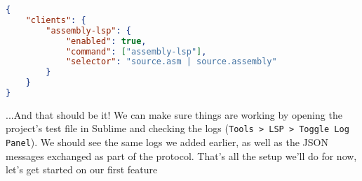 \begin{lstlisting}[language=json]
{
    "clients": {
        "assembly-lsp": {
            "enabled": true,
            "command": ["assembly-lsp"],
            "selector": "source.asm | source.assembly"
        }
    }
}
\end{lstlisting}

...And that should be it! We can make sure things are working by opening the project's
test file in Sublime and checking the logs (\texttt{Tools > LSP > Toggle Log Panel}). 
We should see the same logs we added earlier, as well as the JSON messages exchanged
as part of the protocol. That's all the setup we'll do for now, let's get started
on our first feature







